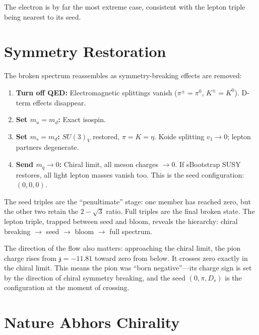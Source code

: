 \documentclass[12pt,a4paper]{article}
\newcommand{\zch}{\mathfrak{z}}
\begin{document}
The electron is by far the most extreme case, consistent with the 
lepton triple being nearest to its seed.

\section{Symmetry Restoration}
\label{sec:restoration}

The broken spectrum reassembles as symmetry-breaking effects are 
removed:

\begin{enumerate}
\item \textbf{Turn off QED:} Electromagnetic splittings vanish 
($\pi^\pm = \pi^0$, $K^\pm = K^0$). D-term effects disappear.
\item \textbf{Set $m_u = m_d$:} Exact isospin.
\item \textbf{Set $m_s = m_d$:} $SU(3)_V$ restored, 
$\pi = K = \eta$. Koide splitting $v_1 \to 0$; lepton partners 
degenerate.
\item \textbf{Send $m_q \to 0$:} Chiral limit, all meson charges 
$\to 0$. If sBootstrap SUSY restores, all light lepton masses 
vanish too. This is the seed configuration: $(0, 0, 0)$.
\end{enumerate}

The seed triples are the ``penultimate'' stage: one member has 
reached zero, but the other two retain the $2 - \sqrt{3}$ ratio. 
Full triples are the final broken state. The lepton triple, 
trapped between seed and bloom, reveals the hierarchy: 
chiral breaking $\to$ seed $\to$ bloom $\to$ full spectrum.

The direction of the flow also matters: approaching the chiral 
limit, the pion charge rises from $\zch = -11.81$ toward zero 
from below. It crosses zero exactly in the chiral limit. This 
means the pion was ``born negative''---its charge sign is set by 
the direction of chiral symmetry breaking, and the seed 
$(0, \pi, D_s)$ is the configuration at the moment of crossing.

\section{Nature Abhors Chirality}
\label{sec:chirality}
\end{document}
